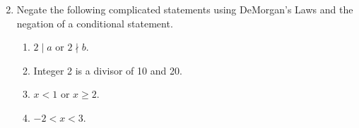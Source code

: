 \documentclass[12 pt]{article}
\newcommand{\Z}{\mathbb{Z}}
\newcommand{\N}{\mathbb{N}}
\newcommand{\divides}{\! \mid \!}
\newcommand{\ndivides}{\! \nmid \!}
\theoremstyle{definition}
\theoremstyle{plain}
\theoremstyle{mytheorem}
\theoremstyle{myexample}
\theoremstyle{mydefinition}
\begin{document}
\begin{enumerate}
\setcounter{enumi}{1}
	\item Negate the following complicated statements using DeMorgan's Laws and the negation of a conditional statement.
	\begin{enumerate} \itemsep1in
	\item $2 \divides a$ or $2 \ndivides b$.
	\item Integer 2 is a divisor of 10 and 20.
	\item $x<1$ or $x \geq 2$.
	\item $-2<x<3$.
	\vspace{1in}
	\end{enumerate}
	




\end{enumerate}
\end{document}
